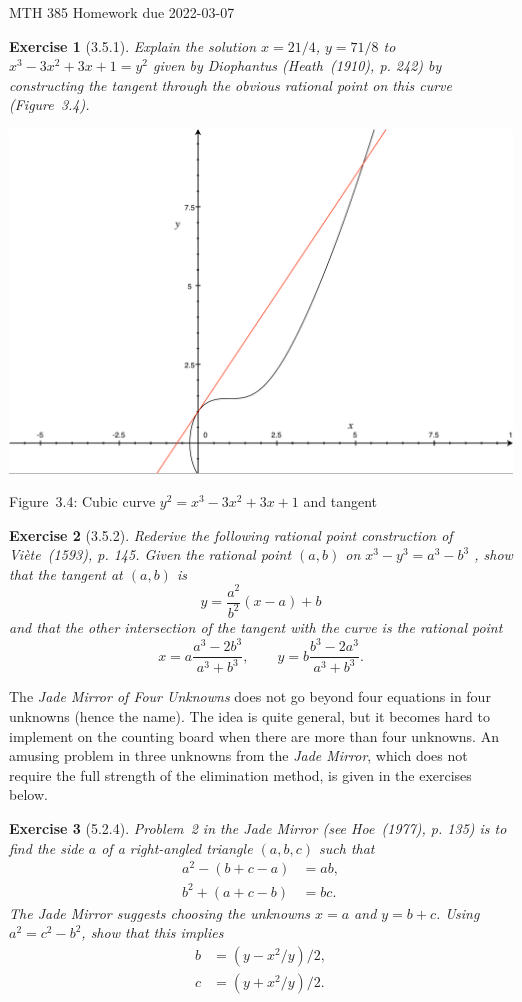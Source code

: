 \documentclass[12pt]{article}
\theoremstyle{plain}
\newtheorem{ex}{Exercise}
\begin{document}
MTH 385 \qquad Homework due 2022-03-07

\begin{ex} [3.5.1]
  Explain the solution $x=21/4$, $y=71/8$ to $x^3-3x^2+3x+1=y^2$ given by Diophantus (Heath~(1910), p. 242) by constructing the tangent through the obvious rational point on this curve (Figure~3.4).
\end{ex}

\begin{center}
\includegraphics[scale=0.5]{cubic}

Figure~3.4: Cubic curve $y^2=x^3-3x^2+3x+1$ and tangent
\end{center}

\begin{ex} [3.5.2]
  Rederive the following rational point construction of Vi\`{e}te~(1593), p. 145. Given the rational point $(a,b)$ on $x^3-y^3=a^3-b^3$ , show that the tangent at $(a,b)$ is
  \[
    y=\frac{a^2}{b^2}(x-a)+b
  \]
  and that the other intersection of the tangent with the curve is the rational point
  \[
    x=a\frac{a^3-2b^3}{a^3+b^3},\qquad y=b\frac{b^3-2a^3}{a^3+b^3}.
  \]
\end{ex}

The \emph{Jade Mirror of Four Unknowns} does not go beyond four equations in four unknowns (hence the name). The idea is quite general, but it becomes hard to implement on the counting board when there are more than four unknowns. An amusing problem in three unknowns from the \emph{Jade Mirror}, which does not require the full strength of the elimination method, is given in the exercises below.

\begin{ex} [5.2.4]
  Problem~2 in the Jade Mirror (see Hoe~(1977), p. 135) is to find the side $a$ of a right-angled triangle $(a,b,c)$ such that
  \begin{align*}
    a^2-(b+c-a) &= ab, \\
    b^2+(a+c-b) &= bc.
  \end{align*}
  The \emph{Jade Mirror} suggests choosing the unknowns $x=a$ and $y=b+c$. Using $a^2=c^2-b^2$, show that this implies
  \begin{align*}
    b &= (y-x^2/y)/2, \\
    c &= (y+x^2/y)/2.
  \end{align*}
\end{ex}
\end{document}
